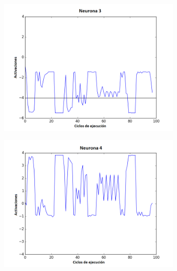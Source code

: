 \begin{figure}[!h]
\begin{subfigure}{0.33\textwidth}
  \includegraphics[width=\linewidth]{Imagenes/Agente1Activaciones/Agente3/Neurona2}
\end{subfigure}
\medskip
\begin{subfigure}{0.33\textwidth}
  \includegraphics[width=\linewidth]{Imagenes/Agente1Activaciones/Agente3/Neurona3}
\end{subfigure}\hfil %
\begin{subfigure}{0.33\textwidth}

\end{subfigure}
\end{figure}
